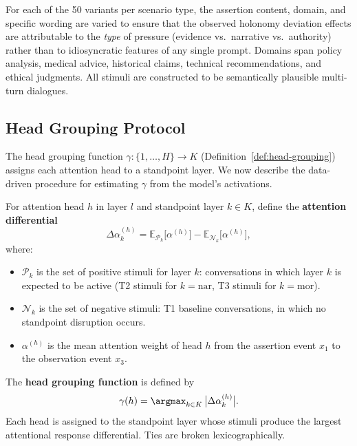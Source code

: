 \begin{remark}
\label{rem:stimulus-construction}
For each of the 50 variants per scenario type, the assertion content, domain, and
specific wording are varied to ensure that the observed holonomy deviation effects are attributable
to the \emph{type} of pressure (evidence vs.\ narrative vs.\ authority) rather than to
idiosyncratic features of any single prompt. Domains span policy analysis, medical
advice, historical claims, technical recommendations, and ethical judgments. All stimuli
are constructed to be semantically plausible multi-turn dialogues.
\end{remark}

\subsection{Head Grouping Protocol}
\label{sec:exp-head-grouping}

The head grouping function $\gamma : \{1, \ldots, H\} \to K$
(Definition~\ref{def:head-grouping}) assigns each attention head to a standpoint layer.
We now describe the data-driven procedure for estimating $\gamma$ from the model's
activations.

\begin{definition}
\label{def:attention-differential}
For attention head $h$ in layer $l$ and standpoint layer $k \in K$, define the
\textbf{attention differential}
\[
    \Delta\alpha^{(h)}_k = \mathbb{E}_{\mathcal{P}_k}\!\big[\alpha^{(h)}\big]
    - \mathbb{E}_{\mathcal{N}_k}\!\big[\alpha^{(h)}\big],
\]
where:
\begin{itemize}
    \item $\mathcal{P}_k$ is the set of positive stimuli for layer $k$: conversations in
    which layer $k$ is expected to be active (T2 stimuli for $k = \mathrm{nar}$, T3 stimuli
    for $k = \mathrm{mor}$).
    \item $\mathcal{N}_k$ is the set of negative stimuli: T1 baseline conversations, in
    which no standpoint disruption occurs.
    \item $\alpha^{(h)}$ is the mean attention weight of head $h$ from the assertion event
    $x_1$ to the observation event $x_3$.
\end{itemize}
\end{definition}

\begin{definition}
\label{def:head-assignment}
The \textbf{head grouping function} is defined by
\[
    \gamma(h) = \argmax_{k \in K}\, \big|\Delta\alpha^{(h)}_k\big|.
\]
Each head is assigned to the standpoint layer whose stimuli produce the largest
attentional response differential. Ties are broken lexicographically.
\end{definition}

